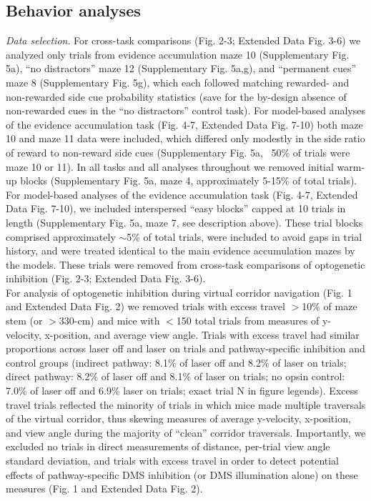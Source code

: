 \subsection{Behavior analyses}
\label{sec:ap1:m7}
\textit{Data selection}. For cross-task comparisons (Fig. 2-3; Extended Data Fig. 3-6) we analyzed only trials from evidence accumulation maze 10 (Supplementary Fig. 5a), “no distractors” maze 12 (Supplementary Fig. 5a,g), and “permanent cues” maze 8 (Supplementary Fig. 5g), which each followed matching rewarded- and non-rewarded side cue probability statistics (save for the by-design absence of non-rewarded cues in the “no distractors” control task). For model-based analyses of the evidence accumulation task (Fig. 4-7, Extended Data Fig. 7-10) both maze 10 and maze 11 data were included, which differed only modestly in the side ratio of reward to non-reward side cues (Supplementary Fig. 5a, ~50\% of trials were maze 10 or 11). In all tasks and all analyses throughout we removed initial warm-up blocks (Supplementary Fig. 5a, maze 4, approximately 5-15\% of total trials). For model-based analyses of the evidence accumulation task (Fig. 4-7, Extended Data Fig. 7-10), we included interspersed “easy blocks” capped at 10 trials in length (Supplementary Fig. 5a, maze 7, see description above). These trial blocks comprised approximately $\sim$5\% of total trials, were included to avoid gaps in trial history, and were treated identical to the main evidence accumulation mazes by the models. These trials were removed from cross-task comparisons of optogenetic inhibition (Fig. 2-3; Extended Data Fig. 3-6). \\
For analysis of optogenetic inhibition during virtual corridor navigation (Fig. 1 and Extended Data Fig. 2) we removed trials with excess travel $>$10\% of maze stem (or $>$330-cm) and mice with $<$150 total trials from measures of y-velocity, x-position, and average view angle. Trials with excess travel had similar proportions across laser off and laser on trials and pathway-specific inhibition and control groups (indirect pathway: 8.1\% of laser off and 8.2\% of laser on trials; direct pathway: 8.2\% of laser off and 8.1\% of laser on trials; no opsin control: 7.0\% of laser off and 6.9\% laser on trials; exact trial N in figure legends). Excess travel trials reflected the minority of trials in which mice made multiple traversals of the virtual corridor, thus skewing measures of average y-velocity, x-position, and view angle during the majority of “clean” corridor traversals. Importantly, we excluded no trials in direct measurements of distance, per-trial view angle standard deviation, and trials with excess travel in order to detect potential effects of pathway-specific DMS inhibition (or DMS illumination alone) on these measures (Fig. 1 and Extended Data Fig. 2). \\
